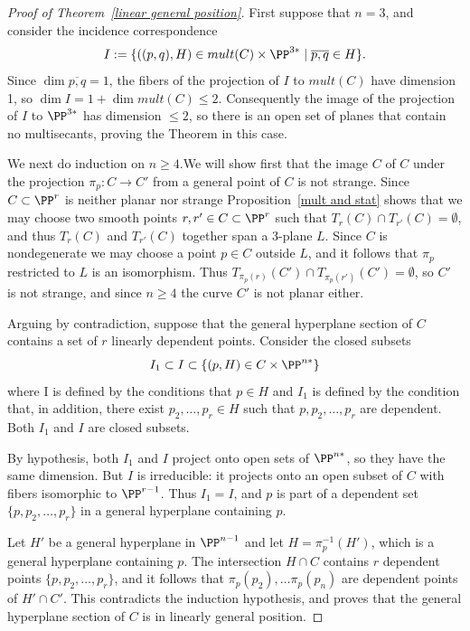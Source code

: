 \begin{proof}[Proof of Theorem~\ref{linear general position}]
First suppose that $n=3$, and consider the incidence correspondence
$$
I := \{ ((p,q), H) \in mult(C) \times \PP^{3*} \mid \overline{p,q}\in H\}.
$$
Since $\dim \overline{p,q} = 1$, the fibers of the projection of $I$ to $mult(C)$ have dimension 1,
so $\dim I = 1+\dim mult(C)  \leq 2$. Consequently the image of  the projection of $I$ to $\PP^{3*}$ has
dimension $\leq 2$, so there is an open set of planes that contain no multisecants, proving the Theorem in this case.

We next do induction on $n\geq 4$.We will show first that the image $C$ of
$C$ under the projection $\pi_p: C\to C'$ from a general point of $C$ is not strange. Since $C\subset \PP^r$ is neither
planar nor strange
Proposition~\ref{mult and stat} shows that we may choose two smooth points
$r,r'\in C\subset \PP^r$ such that $T_r(C)\cap T_{r'}(C) = \emptyset$, and thus 
$T_r(C)$ and $T_{r'}(C)$ together span a 3-plane $L$. Since $C$ is nondegenerate we may
choose a point $p\in C$ outside $L$, and it follows that $\pi_p$ restricted to $L$ is an isomorphism.
Thus $T_{\pi_p(r)}(C') \cap T_{\pi_p({r'})}(C') = \emptyset$, so $C'$ is not strange, 
and since $n\geq 4$ the curve $C'$ is not planar either.

Arguing by contradiction, suppose that the general hyperplane section of $C$ contains a set of $r$ linearly dependent points. Consider the closed subsets  
$$
I_1 \subset I \subset \{(p,H) \in C \times \PP^{n*}\}
$$
where I is defined by the conditions that $p\in H$ and $I_1$ is defined by the condition that, in addition, there exist $p_2,\dots, p_r\in H$
such that $p, p_2, \dots, p_r$ are dependent. Both $I_1$ and $I$ are closed subsets.

By hypothesis, both $I_1$ and $I$ project onto open sets of $\PP^{n*}$, so they have the same dimension.
But $I$ is irreducible: it projects onto an open subset of $C$ with fibers isomorphic to $\PP^{r-1}$. Thus $I_1 = I$,
and  $p$ is part of a dependent set
$\{p, p_2,\dots, p_r\}$ in a general hyperplane containing $p$.

Let $H'$ be a general hyperplane in $\PP^{n-1}$
and let $H = \pi_p^{-1}(H')$, which is a general hyperplane containing $p$. The intersection $H\cap C$
contains $r$ dependent points $\{p, p_2,\dots, p_r\}$, and it follows that $\pi_p(p_2),\dots \pi_p(p_n)$
are dependent points of $H'\cap C'$. This contradicts the induction hypothesis, and proves that
the general hyperplane section of $C$ is in linearly general position.
\end{proof}
 
